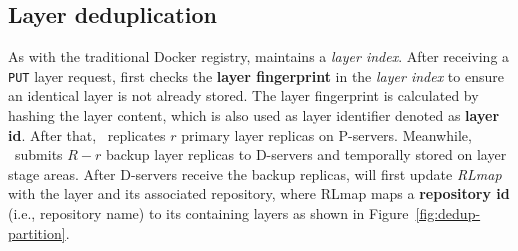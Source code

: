 \subsection{Layer deduplication}
\label{sec:dedup-desgin}


%

%


As with the traditional Docker registry, 
\sysname maintains a \emph{layer index}.
After receiving a \texttt{PUT} layer request,
\sysname first checks the \textbf{layer fingerprint} in the \emph{layer index} to ensure 
an identical layer is not already stored.
The layer fingerprint is calculated by hashing the layer content, which is also used as layer identifier denoted as \textbf{layer id}.
After that, \sysname~replicates $r$ primary layer replicas on P-servers. 
Meanwhile, \sysname~submits $R-r$ backup layer replicas to D-servers and temporally stored on layer stage areas.
 After D-servers receive the backup replicas,
 \sysname will first update \emph{RLmap} with the layer and its associated repository, where
RLmap maps a \textbf{repository id} (i.e., repository name) to its containing layers 
as shown in Figure~\ref{fig:dedup-partition}.

 
